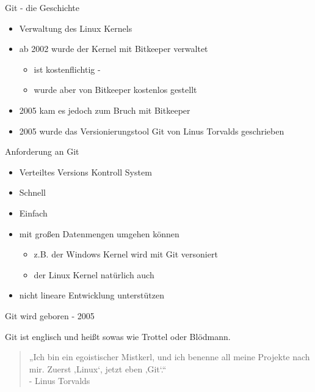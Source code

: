 \documentclass{beamer}
\begin{document}
\begin{frame}{Git - die Geschichte}
   
    \begin{itemize}
        \item Verwaltung des Linux Kernels
        \item ab 2002 wurde der Kernel mit Bitkeeper verwaltet
            \begin{itemize}
                \item ist kostenflichtig - 
                \item wurde aber von Bitkeeper kostenlos gestellt
            \end{itemize}
        \item 2005 kam es jedoch zum Bruch mit Bitkeeper
        \item 2005 wurde das Versionierungstool Git von Linus Torvalds geschrieben
    \end{itemize}

\end{frame}

\begin{frame}{Anforderung an Git}
    
    \begin{itemize}
        \item Verteiltes Versions Kontroll System
        \item Schnell
        \item Einfach
        \item mit großen Datenmengen umgehen können
        \begin{itemize}
         \item z.B. der Windows Kernel wird mit Git versoniert
         \item der Linux Kernel natürlich auch
        \end{itemize}
        \item nicht lineare Entwicklung unterstützen
    \end{itemize}

\end{frame}

\begin{frame}{Git wird geboren - 2005}

Git ist englisch und heißt sowas wie Trottel oder Blödmann. \newline \newline

  \begin{quote}
    „Ich bin ein egoistischer Mistkerl, und ich benenne all meine Projekte nach mir. Zuerst ‚Linux‘, jetzt eben ‚Git‘.“  \\
    - Linus Torvalds
  \end{quote}
  
\end{frame}
\end{document}
